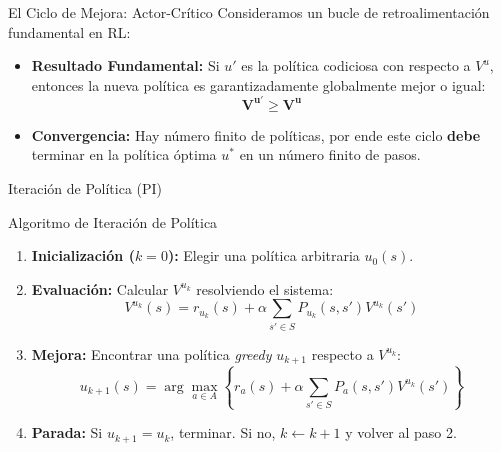 \documentclass[xcolor=dvipsnames]{beamer}
\begin{document}
\begin{frame}{El Ciclo de Mejora: Actor-Cr\'itico}
Consideramos un bucle de retroalimentaci\'on fundamental en RL:

\begin{center}
\end{center}

\begin{itemize}
    \item<2-> \textbf{Resultado Fundamental:} Si $u'$ es la pol\'itica codiciosa con respecto a $V^u$, entonces la nueva pol\'itica es garantizadamente globalmente mejor o igual:
    \[ \mathbf{V^{u'} \geq V^u} \]
    \item<3-> \textbf{Convergencia:} Hay n\'umero finito de pol\'iticas, por ende este ciclo \textbf{debe} terminar en la pol\'itica \'optima $u^*$ en un n\'umero finito de pasos.
\end{itemize}
\end{frame}
\begin{frame}{Iteraci\'on de Pol\'itica (PI)}
\begin{block}{Algoritmo de Iteraci\'on de Pol\'itica}
\small %
\begin{enumerate}
    \setlength{\itemsep}{0.5em} %
    \item \textbf{Inicializaci\'on ($k=0$):} Elegir una pol\'itica arbitraria $u_0(s)$.
    \item \textbf{Evaluaci\'on:} Calcular $V^{u_k}$ resolviendo el sistema:
    \[ V^{u_k}(s) = r_{u_k}(s) + \alpha \sum_{s' \in S} P_{u_k}(s, s') V^{u_k}(s') \]
    \item \textbf{Mejora:} Encontrar una pol\'itica \textit{greedy} $u_{k+1}$ respecto a $V^{u_k}$:
    \[ u_{k+1}(s) = \arg\max_{a \in A} \left\{ r_a(s) + \alpha \sum_{s' \in S} P_a(s, s') V^{u_k}(s') \right\} \]
    \item \textbf{Parada:} Si $u_{k+1} = u_k$, terminar. Si no, $k \leftarrow k+1$ y volver al paso 2.
\end{enumerate}
\end{block}
\end{frame}
\end{document}
